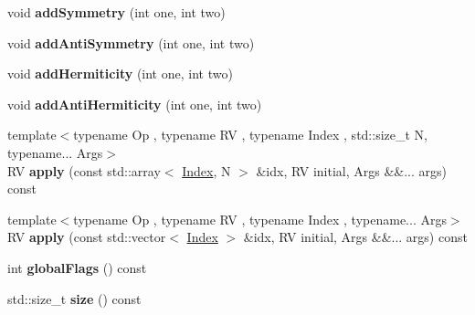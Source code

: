 \begin{DoxyCompactItemize}
\item 
\mbox{\label{class_eigen_1_1_dynamic_s_group_a2efbaedb2063d418df9e3056b7616b20}} 
void {\bfseries add\+Symmetry} (int one, int two)
\item 
\mbox{\label{class_eigen_1_1_dynamic_s_group_ac8415c3653c3c1e7053f8f930f2b9e24}} 
void {\bfseries add\+Anti\+Symmetry} (int one, int two)
\item 
\mbox{\label{class_eigen_1_1_dynamic_s_group_a2faa098d02f0715fc82699ec1cf999c1}} 
void {\bfseries add\+Hermiticity} (int one, int two)
\item 
\mbox{\label{class_eigen_1_1_dynamic_s_group_a4391a25c9d7edff1b2806f6f5be3c7b7}} 
void {\bfseries add\+Anti\+Hermiticity} (int one, int two)
\item 
\mbox{\label{class_eigen_1_1_dynamic_s_group_ad201a814e4a7147a044ff104f992d1e7}} 
{\footnotesize template$<$typename Op , typename RV , typename Index , std\+::size\+\_\+t N, typename... Args$>$ }\\RV {\bfseries apply} (const std\+::array$<$ \hyperlink{namespace_eigen_a62e77e0933482dafde8fe197d9a2cfde}{Index}, N $>$ \&idx, RV initial, Args \&\&... args) const
\item 
\mbox{\label{class_eigen_1_1_dynamic_s_group_ae77f8b44a874bcff6c52c1f82cd5a5c2}} 
{\footnotesize template$<$typename Op , typename RV , typename Index , typename... Args$>$ }\\RV {\bfseries apply} (const std\+::vector$<$ \hyperlink{namespace_eigen_a62e77e0933482dafde8fe197d9a2cfde}{Index} $>$ \&idx, RV initial, Args \&\&... args) const
\item 
\mbox{\label{class_eigen_1_1_dynamic_s_group_a8272d8c971713b3e328a13c33ac38b20}} 
int {\bfseries global\+Flags} () const
\item 
\mbox{\label{class_eigen_1_1_dynamic_s_group_acb5356798035ce1ae0d00eec033ef32f}} 
std\+::size\+\_\+t {\bfseries size} () const
\item 

\end{DoxyCompactItemize}
